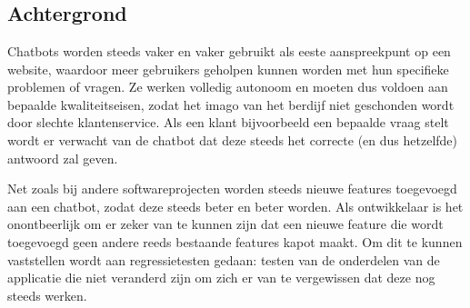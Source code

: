 
\chapter{}
\label{ch:inleiding}

%

\section{Achtergrond}
\label{sec:achtergrond}

Chatbots worden steeds vaker en vaker gebruikt als eeste aanspreekpunt op een website, waardoor meer gebruikers geholpen kunnen worden met hun specifieke problemen of vragen. Ze werken volledig autonoom en moeten dus voldoen aan bepaalde kwaliteitseisen, zodat het imago van het berdijf niet geschonden wordt door slechte klantenservice. Als een klant bijvoorbeeld een bepaalde vraag stelt wordt er verwacht van de chatbot dat deze steeds het correcte (en dus hetzelfde) antwoord zal geven. 

Net zoals bij andere softwareprojecten worden steeds nieuwe features toegevoegd aan een chatbot, zodat deze steeds beter en beter worden. Als ontwikkelaar is het onontbeerlijk om er zeker van te kunnen zijn dat een nieuwe feature die wordt toegevoegd geen andere reeds bestaande features kapot maakt. Om dit te kunnen vaststellen wordt aan regressietesten gedaan: testen van de onderdelen van de applicatie die niet veranderd zijn om zich er van te vergewissen dat deze nog steeds werken.


